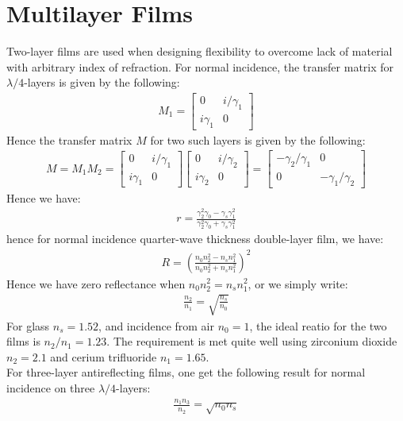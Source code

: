 \documentclass[11pt]{book}
\theoremstyle{break}
\theoremstyle{break}
\newcommand{\bmat}[1]{\begin{bmatrix} #1 \end{bmatrix}}
\begin{document}
\section[Multilayer Films]{\color{red} Multilayer Films\color{black}}
Two-layer films are used when designing flexibility to overcome lack of material with arbitrary index of refraction. For normal incidence, the transfer matrix for $\lambda/4$-layers is given by the following:
\begin{align*}
M_1 = \bmat{0 & i/\gamma_1 \\ i\gamma_1 & 0}
\end{align*}
Hence the transfer matrix $M$ for two such layers is given by the following:
\begin{align*}
M = M_1 M_2 = \bmat{0 & i/\gamma_1 \\ i\gamma_1 & 0}\bmat{0 & i/\gamma_2 \\ i\gamma_2 & 0}= \bmat{-\gamma_2/\gamma_1 & 0 \\ 0 & -\gamma_1/\gamma_2}
\tag{double $\lambda/4$-layers}
\end{align*}
Hence we have:
\begin{align*}
r = \frac{\gamma_2^2 \gamma_0 - \gamma_s \gamma_1^2}{\gamma_2^2 \gamma_0 + \gamma_s \gamma_1^2}
\tag{double $\lambda/4$-layers}
\end{align*}
hence for normal incidence quarter-wave thickness double-layer film, we have:
\begin{align*}
R = \left( \frac{n_0 n_2^2 - n_s n_1^2}{n_0 n_2^2 + n_s n_1^2}\right)^2 \tag{normal incidence double $\lambda/4$-layers}
\end{align*}
Hence we have zero reflectance when $n_0n_2^2 = n_sn_1^2$, or we simply write:
\begin{align*}
\frac{n_2}{n_1} = \sqrt{\frac{n_s}{n_0}}
\end{align*}
For glass $n_s = 1.52$, and incidence from air $n_0 = 1$, the ideal reatio for the two films is $n_2/n_1 = 1.23$. The requirement is met quite well using zirconium dioxide $n_2 = 2.1$ and cerium trifluoride $n_1 = 1.65$. \\

For three-layer antireflecting films, one get the following result for normal incidence on three $\lambda/4$-layers:
\begin{align*}
\frac{n_1n_3}{n_2} = \sqrt{n_0 n_s}
\end{align*}
\end{document}
